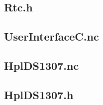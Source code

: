 \documentclass[12pt,a4paper,titlepage,oneside]{article}
\begin{document}
{\subsection{Rtc.h}


\subsection{UserInterfaceC.nc}


\subsection{HplDS1307.nc}


\subsection{HplDS1307.h}


}%
\end{document}
